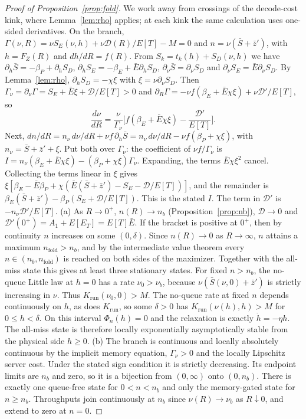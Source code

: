 \begin{proof}[Proof of Proposition~\ref{prop:fold}]
We work away from crossings of the decode-cost kink, where Lemma~\ref{lem:rho} applies; at each kink the same calculation uses one-sided derivatives. On the branch, $\Gamma(\nu,R)=\nu S_E(\nu,h)+\nu\mathcal D(R)/E[T]-M=0$ and $n=\nu(\bar S+\bar z')$, with $h=F_Z(R)$ and $dh/dR=f(R)$. From $S_k=t_k(h)+S_D(\nu,h)$ we have $\partial_h\bar S=-\beta_P+\partial_hS_D$, $\partial_hS_E=-\beta_E+\bar E\partial_hS_D$, $\partial_\nu\bar S=\partial_\nu S_D$ and $\partial_\nu S_E=\bar E\partial_\nu S_D$. By Lemma~\ref{lem:rho}, $\partial_hS_D=-\chi\xi$ with $\xi=\nu\partial_\nu S_D$. Then $\Gamma_\nu=\partial_\nu\Gamma=S_E+\bar E\xi+\mathcal D/E[T]>0$ and $\partial_R\Gamma=-\nu f(\beta_E+\bar E\chi\xi)+\nu\mathcal D'/E[T]$, so
\[\frac{d\nu}{dR}=\frac{\nu}{\Gamma_\nu}\Big[f(\beta_E+\bar E\chi\xi)-\frac{\mathcal D'}{E[T]}\Big].\]
Next, $dn/dR=n_\nu\,d\nu/dR+\nu f\,\partial_h\bar S=n_\nu\,d\nu/dR-\nu f(\beta_P+\chi\xi)$, with $n_\nu=\bar S+\bar z'+\xi$. Put both over $\Gamma_\nu$: the coefficient of $\nu f/\Gamma_\nu$ is $I=n_\nu(\beta_E+\bar E\chi\xi)-(\beta_P+\chi\xi)\Gamma_\nu$. Expanding, the terms $\bar E\chi\xi^2$ cancel. Collecting the terms linear in $\xi$ gives $\xi[\beta_E-\bar E\beta_P+\chi(\bar E(\bar S+\bar z')-S_E-\mathcal D/E[T])]$, and the remainder is $\beta_E(\bar S+\bar z')-\beta_P(S_E+\mathcal D/E[T])$. This is the stated $I$. The term in $\mathcal D'$ is $-n_\nu\mathcal D'/E[T]$.
(a) As $R\to0^+$, $n(R)\to n_b$ (Proposition~\ref{prop:nb}), $\mathcal D\to0$ and $\mathcal D'(0^+)=A_1+E[E_T]=E[T]\bar E$. If the bracket is positive at $0^+$, then by continuity $n$ increases on some $(0,\delta)$. Since $n(R)\to0$ as $R\to\infty$, $n$ attains a maximum $n_{\mathrm{fold}}>n_b$, and by the intermediate value theorem every $n\in(n_b,n_{\mathrm{fold}})$ is reached on both sides of the maximizer. Together with the all-miss state this gives at least three stationary states. For fixed $n>n_b$, the no-queue Little law at $h=0$ has a rate $\nu_0>\nu_b$, because $\nu(\bar S(\nu,0)+\bar z')$ is strictly increasing in $\nu$. Thus $K_{\mathrm{run}}(\nu_0,0)>M$. The no-queue rate at fixed $n$ depends continuously on $h$, as does $K_{\mathrm{run}}$, so some $\delta>0$ has $K_{\mathrm{run}}(\nu(h),h)>M$ for $0\le h<\delta$. On this interval $\Phi_n(h)=0$ and the relaxation is exactly $\dot h=-\eta h$. The all-miss state is therefore locally exponentially asymptotically stable from the physical side $h\ge0$.
(b) The branch is continuous and locally absolutely continuous by the implicit memory equation, $\Gamma_\nu>0$ and the locally Lipschitz server cost. Under the stated sign condition it is strictly decreasing. Its endpoint limits are $n_b$ and zero, so it is a bijection from $(0,\infty)$ onto $(0,n_b)$. There is exactly one queue-free state for $0<n<n_b$ and only the memory-gated state for $n\ge n_b$. Throughputs join continuously at $n_b$ since $\nu(R)\to\nu_b$ as $R\downarrow0$, and extend to zero at $n=0$.


\end{proof}
